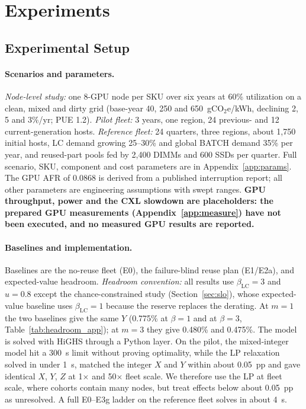 \documentclass{article} %
\begin{document}
\section{Experiments}
\label{sec:experiments}
\subsection{Experimental Setup}
\label{sec:setup}
\paragraph{Scenarios and parameters.} \emph{Node-level study:} one 8-GPU node per SKU over six years at 60\% utilization on a clean, mixed and dirty grid (base-year 40, 250 and 650~gCO$_2$e/kWh, declining 2, 5 and 3\%/yr; PUE 1.2). \emph{Pilot fleet:} 3 years, one region, 24 previous- and 12 current-generation hosts. \emph{Reference fleet:} 24 quarters, three regions, about 1,750 initial hosts, LC demand growing 25--30\% and global BATCH demand 35\% per year, and reused-part pools fed by 2,400 DIMMs and 600 SSDs per quarter. Full scenario, SKU, component and cost parameters are in Appendix~\ref{app:params}. The GPU AFR of 0.0868 is derived from a published interruption report; all other parameters are engineering assumptions with swept ranges. \textbf{GPU throughput, power and the CXL slowdown are placeholders: the prepared GPU measurements (Appendix~\ref{app:measure}) have not been executed, and no measured GPU results are reported.}

\paragraph{Baselines and implementation.} Baselines are the no-reuse fleet (E0), the failure-blind reuse plan (E1/E2a), and expected-value headroom. \emph{Headroom convention:} all results use $\beta_{\text{LC}}=3$ and $u=0.8$ except the chance-constrained study (Section~\ref{sec:slo}), whose expected-value baseline uses $\beta_{\text{LC}}=1$ because the reserve replaces the derating. At $m=1$ the two baselines give the same $Y$ (0.775\% at $\beta=1$ and at $\beta=3$, Table~\ref{tab:headroom_app}); at $m=3$ they give 0.480\% and 0.475\%. The model is solved with HiGHS through a Python layer. On the pilot, the mixed-integer model hit a 300~s limit without proving optimality, while the LP relaxation solved in under 1~s, matched the integer $X$ and $Y$ within about 0.05~pp and gave identical $X$, $Y$, $Z$ at 1$\times$ and 50$\times$ fleet scale. We therefore use the LP at fleet scale, where cohorts contain many nodes, but treat effects below about 0.05~pp as unresolved. A full E0--E3g ladder on the reference fleet solves in about 4~s.
\end{document}
